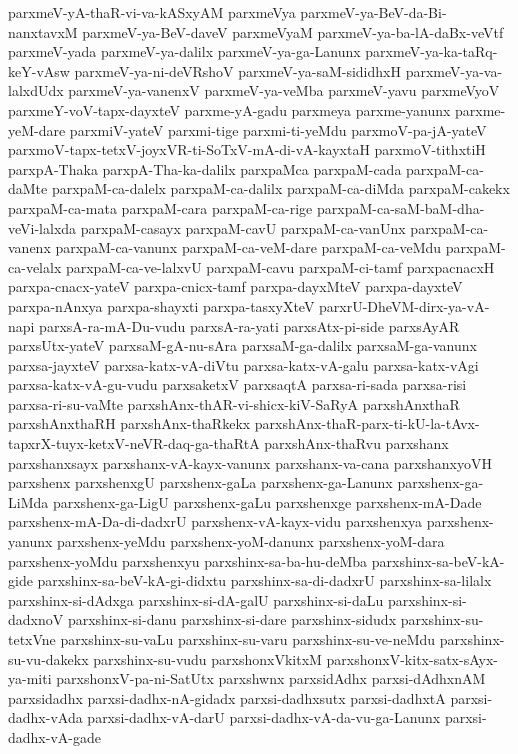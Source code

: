 {parxmeV-yA-thaR-vi-va-kASxyAM
parxmeVya
parxmeV-ya-BeV-da-Bi-nanxtavxM
parxmeV-ya-BeV-daveV
parxmeVyaM
parxmeV-ya-ba-lA-daBx-veVtf
parxmeV-yada
parxmeV-ya-dalilx
parxmeV-ya-ga-Lanunx
parxmeV-ya-ka-taRq-keY-vAsw
parxmeV-ya-ni-deVRshoV
parxmeV-ya-saM-sididhxH
parxmeV-ya-va-lalxdUdx
parxmeV-ya-vanenxV
parxmeV-ya-veMba
parxmeV-yavu
parxmeVyoV
parxmeY-voV-tapx-dayxteV
parxme-yA-gadu
parxmeya
parxme-yanunx
parxme-yeM-dare
parxmiV-yateV
parxmi-tige
parxmi-ti-yeMdu
parxmoV-pa-jA-yateV
parxmoV-tapx-tetxV-joyxVR-ti-SoTxV-mA-di-vA-kayxtaH
parxmoV-tithxtiH
parxpA-Thaka
parxpA-Tha-ka-dalilx
parxpaMca
parxpaM-cada
parxpaM-ca-daMte
parxpaM-ca-dalelx
parxpaM-ca-dalilx
parxpaM-ca-diMda
parxpaM-cakekx
parxpaM-ca-mata
parxpaM-cara
parxpaM-ca-rige
parxpaM-ca-saM-baM-dha-veVi-lalxda
parxpaM-casayx
parxpaM-cavU
parxpaM-ca-vanUnx
parxpaM-ca-vanenx
parxpaM-ca-vanunx
parxpaM-ca-veM-dare
parxpaM-ca-veMdu
parxpaM-ca-velalx
parxpaM-ca-ve-lalxvU
parxpaM-cavu
parxpaM-ci-tamf
parxpacnacxH
parxpa-cnacx-yateV
parxpa-cnicx-tamf
parxpa-dayxMteV
parxpa-dayxteV
parxpa-nAnxya
parxpa-shayxti
parxpa-tasxyXteV
parxrU-DheVM-dirx-ya-vA-napi
parxsA-ra-mA-Du-vudu
parxsA-ra-yati
parxsAtx-pi-side
parxsAyAR
parxsUtx-yateV
parxsaM-gA-nu-sAra
parxsaM-ga-dalilx
parxsaM-ga-vanunx
parxsa-jayxteV
parxsa-katx-vA-diVtu
parxsa-katx-vA-galu
parxsa-katx-vAgi
parxsa-katx-vA-gu-vudu
parxsaketxV
parxsaqtA
parxsa-ri-sada
parxsa-risi
parxsa-ri-su-vaMte
parxshAnx-thAR-vi-shicx-kiV-SaRyA
parxshAnxthaR
parxshAnxthaRH
parxshAnx-thaRkekx
parxshAnx-thaR-parx-ti-kU-la-tAvx-tapxrX-tuyx-ketxV-neVR-daq-ga-thaRtA
parxshAnx-thaRvu
parxshanx
parxshanxsayx
parxshanx-vA-kayx-vanunx
parxshanx-va-cana
parxshanxyoVH
parxshenx
parxshenxgU
parxshenx-gaLa
parxshenx-ga-Lanunx
parxshenx-ga-LiMda
parxshenx-ga-LigU
parxshenx-gaLu
parxshenxge
parxshenx-mA-Dade
parxshenx-mA-Da-di-dadxrU
parxshenx-vA-kayx-vidu
parxshenxya
parxshenx-yanunx
parxshenx-yeMdu
parxshenx-yoM-danunx
parxshenx-yoM-dara
parxshenx-yoMdu
parxshenxyu
parxshinx-sa-ba-hu-deMba
parxshinx-sa-beV-kA-gide
parxshinx-sa-beV-kA-gi-didxtu
parxshinx-sa-di-dadxrU
parxshinx-sa-lilalx
parxshinx-si-dAdxga
parxshinx-si-dA-galU
parxshinx-si-daLu
parxshinx-si-dadxnoV
parxshinx-si-danu
parxshinx-si-dare
parxshinx-sidudx
parxshinx-su-tetxVne
parxshinx-su-vaLu
parxshinx-su-varu
parxshinx-su-ve-neMdu
parxshinx-su-vu-dakekx
parxshinx-su-vudu
parxshonxVkitxM
parxshonxV-kitx-satx-sAyx-ya-miti
parxshonxV-pa-ni-SatUtx
parxshwnx
parxsidAdhx
parxsi-dAdhxnAM
parxsidadhx
parxsi-dadhx-nA-gidadx
parxsi-dadhxsutx
parxsi-dadhxtA
parxsi-dadhx-vAda
parxsi-dadhx-vA-darU
parxsi-dadhx-vA-da-vu-ga-Lanunx
parxsi-dadhx-vA-gade
}
